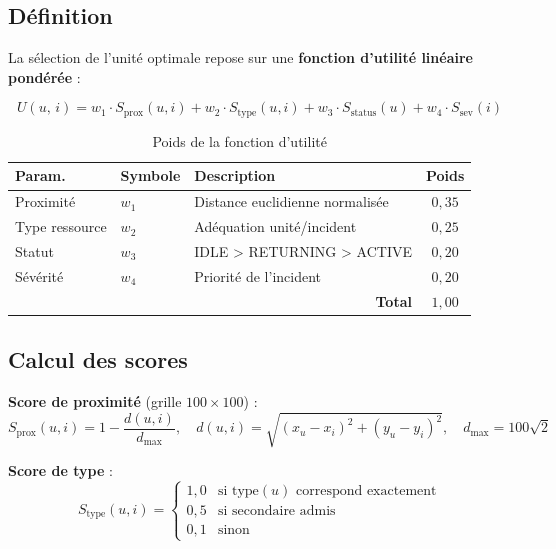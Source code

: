 \documentclass[12pt, a4paper]{report}
\begin{document}
\subsection{Définition}

La sélection de l'unité optimale repose sur une \textbf{fonction d'utilité linéaire
pondérée} :

\begin{equation}
  \boxed{
    U(u,\,i) = w_1 \cdot S_{\text{prox}}(u,i)
             + w_2 \cdot S_{\text{type}}(u,i)
             + w_3 \cdot S_{\text{status}}(u)
             + w_4 \cdot S_{\text{sev}}(i)
  }
  \label{eq:utility}
\end{equation}

\begin{table}[H]
\centering
\caption{Poids de la fonction d'utilité}
\begin{tabularx}{0.80\textwidth}{llXc}
\toprule
\rowcolor{NavyCard!15}
\color{CyanNeon}Param. & \color{CyanNeon}Symbole & \color{CyanNeon}Description & \color{CyanNeon}Poids \\
\midrule
Proximité         & $w_1$ & Distance euclidienne normalisée & $0{,}35$ \\
Type ressource    & $w_2$ & Adéquation unité/incident       & $0{,}25$ \\
Statut            & $w_3$ & IDLE > RETURNING > ACTIVE       & $0{,}20$ \\
Sévérité          & $w_4$ & Priorité de l'incident          & $0{,}20$ \\
\midrule
\multicolumn{3}{r}{\textbf{Total}} & $1{,}00$ \\
\bottomrule
\end{tabularx}
\end{table}

\subsection{Calcul des scores}

\textbf{Score de proximité} (grille $100 \times 100$) :
\[
  S_{\text{prox}}(u,i)
  = 1 - \frac{d(u,i)}{d_{\max}}, \quad
  d(u,i) = \sqrt{(x_u{-}x_i)^2 + (y_u{-}y_i)^2}, \quad
  d_{\max} = 100\sqrt{2}
\]

\textbf{Score de type} :
\[
  S_{\text{type}}(u,i) =
  \begin{cases}
    1{,}0 & \text{si type}(u) \text{ correspond exactement} \\
    0{,}5 & \text{si secondaire admis} \\
    0{,}1 & \text{sinon}
  \end{cases}
\]
\end{document}
